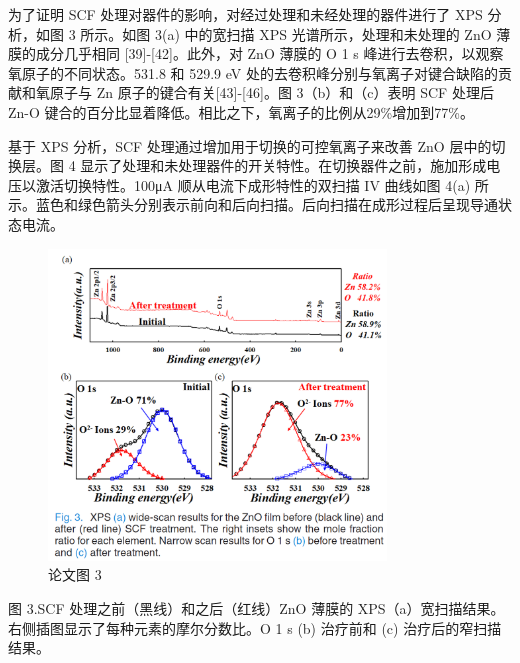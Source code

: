 为了证明 SCF 处理对器件的影响，对经过处理和未经处理的器件进行了 XPS 分析，如图 3 所示。如图 3(a) 中的宽扫描 XPS 光谱所示，处理和未处理的 ZnO 薄膜的成分几乎相同 [39]-[42]。此外，对 ZnO 薄膜的 O 1 s 峰进行去卷积，以观察氧原子的不同状态。531.8 和 529.9 eV 处的去卷积峰分别与氧离子对键合缺陷的贡献和氧原子与 Zn 原子的键合有关[43]-[46]。图 3（b）和（c）表明 SCF 处理后 Zn-O 键合的百分比显着降低。相比之下，氧离子的比例从29\%增加到77\%。

基于 XPS 分析，SCF 处理通过增加用于切换的可控氧离子来改善 ZnO 层中的切换层。图 4 显示了处理和未处理器件的开关特性。在切换器件之前，施加形成电压以激活切换特性。100μA 顺从电流下成形特性的双扫描 IV 曲线如图 4(a) 所示。蓝色和绿色箭头分别表示前向和后向扫描。后向扫描在成形过程后呈现导通状态电流。

\begin{figure}[htb]
\centering 
\includegraphics[width=0.80\textwidth]{img/c1m3.png} 
\caption{论文图 3}
\label{Test}
\end{figure}

图 3.SCF 处理之前（黑线）和之后（红线）ZnO 薄膜的 XPS（a）宽扫描结果。右侧插图显示了每种元素的摩尔分数比。O 1 s (b) 治疗前和 (c) 治疗后的窄扫描结果。



